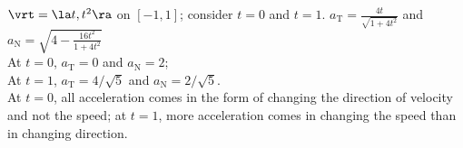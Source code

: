 {$\vrt = \la t,t^2 \ra$ on $[-1,1]$; consider $t=0$ and $t=1$.
}
{$a_{\text{T}} = \frac{4t}{\sqrt{1+4t^2}}$ and $a_{\text{N}} = \sqrt{4-\frac{16t^2}{1+4t^2}}$\\
At $t=0$, $a_{\text{T}} = 0$ and $a_{\text{N}} = 2$;\\
At $t=1$, $a_{\text{T}} = 4/\sqrt{5}$ and $a_{\text{N}} = 2/\sqrt{5}$.\\
At $t=0$, all acceleration comes in the form of changing the direction of velocity and not the speed; at $t=1$, more acceleration comes in changing the speed than in changing direction.
}